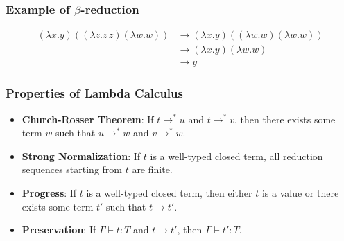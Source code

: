 \documentclass{beamer}
\begin{document}
\begin{frame}
\frametitle{Example of $\beta$-reduction}
\begin{align*}
(\lambda x. y)((\lambda z. z\,z)(\lambda w. w)) &\to (\lambda x. y)((\lambda w. w)(\lambda w. w)) \\
&\to (\lambda x. y)(\lambda w. w) \\
&\to y
\end{align*}
\end{frame}


\begin{frame}
\frametitle{Properties of Lambda Calculus}
\begin{itemize}
    \item \textbf{Church-Rosser Theorem}: If $t \rightarrow^* u$ and $t \rightarrow^* v$, then there exists some term $w$ such that $u \rightarrow^* w$ and $v \rightarrow^* w$.
    \item \textbf{Strong Normalization}: If $t$ is a well-typed closed
      term, all reduction sequences starting from $t$ are finite.
    \item \textbf{Progress}: If $t$ is a well-typed closed term, then either $t$ is a value or there exists some term $t'$ such that $t \rightarrow t'$.
    \item \textbf{Preservation}: If $\Gamma \vdash t : T$ and $t \rightarrow t'$, then $\Gamma \vdash t' : T$.
\end{itemize}
\end{frame}
\end{document}
